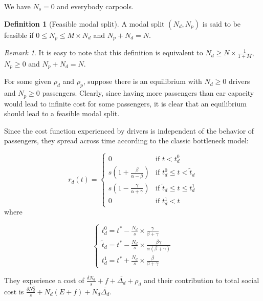 \documentclass[english, a4paper]{article}
\theoremstyle{plain}
\theoremstyle{definition}
\newtheorem{definition}{Definition}
\theoremstyle{remark}
\newtheorem{remark}{Remark}
\begin{document}
We have $N_s = 0$ and everybody carpools.

\begin{definition}[Feasible modal split]
    A modal split $(N_d, N_p)$ is said to be feasible if $0 \leq N_p \leq M \times N_d$ and $N_p + N_d = N$.    
\end{definition}

\begin{remark}
    It is easy to note that this definition is equivalent to $N_d \geq N \times \frac{1}{1+M}$, $N_p \geq 0$ and $N_p + N_d = N$.
\end{remark}

For some given $\rho_d$ and $\rho_p$, suppose there is an equilibrium with $N_d \geq 0$ drivers and $N_p \geq 0$ passengers. Clearly, since having more passengers than car capacity would lead to infinite cost for some passengers, it is clear that an equilibrium should lead to a feasible modal split.

Since the cost function experienced by drivers is independent of the behavior of passengers, they spread across time according to the classic bottleneck model:

\begin{equation}
\label{eq_rd}
r_d(t) = \left\{
\begin{array}{lr}
    0 & \text{if } t<t_d^0\\
    s\left( 1 + \frac{\beta}{\alpha - \beta} \right) & \text{if } t_d^0 \leq t < \tilde{t}_d\\
    s\left( 1 - \frac{\gamma}{\alpha + \gamma} \right) & \text{if } \tilde{t}_d \leq t \leq t_d^1\\
    0 & \text{if } t_d^1 < t
\end{array}
\right.
\end{equation}
where

\begin{equation}
\label{eq_td}
\left\{
\begin{array}{l}
    t_d^0 = t^* - \frac{N_d}{s} \times \frac{\gamma}{\beta + \gamma}\\
    \tilde{t}_d = t^* - \frac{N_d}{s} \times \frac{\beta \gamma}{\alpha(\beta + \gamma)}\\
    t_d^1 = t^* + \frac{N_d}{s} \times \frac{\beta}{\beta + \gamma}
\end{array}
\right.
\end{equation}

They experience a cost of $\frac{\delta N_d}{s} + f + \overline{\Delta _d} + \rho _d$ and their contribution to total social cost is $\frac{\delta N_d^2}{s} + N_d(E + f) + N_d \overline{\Delta _d}$.
\end{document}

